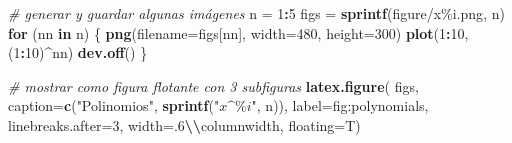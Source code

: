 \documentclass[a4paper,conference]{IEEEtran}
\newenvironment{Shaded}{\begin{snugshade}}{\end{snugshade}}
\newcommand{\AttributeTok}[1]{\textcolor[rgb]{0.13,0.29,0.53}{#1}}
\newcommand{\CommentTok}[1]{\textcolor[rgb]{0.56,0.35,0.01}{\textit{#1}}}
\newcommand{\ControlFlowTok}[1]{\textcolor[rgb]{0.13,0.29,0.53}{\textbf{#1}}}
\newcommand{\DecValTok}[1]{\textcolor[rgb]{0.00,0.00,0.81}{#1}}
\newcommand{\FunctionTok}[1]{\textcolor[rgb]{0.13,0.29,0.53}{\textbf{#1}}}
\newcommand{\NormalTok}[1]{#1}
\newcommand{\OtherTok}[1]{\textcolor[rgb]{0.56,0.35,0.01}{#1}}
\newcommand{\SpecialCharTok}[1]{\textcolor[rgb]{0.81,0.36,0.00}{\textbf{#1}}}
\newcommand{\StringTok}[1]{\textcolor[rgb]{0.31,0.60,0.02}{#1}}
\begin{document}
\begin{Shaded}
\begin{Highlighting}[]
\CommentTok{\# generar y guardar algunas imágenes}
\NormalTok{n }\OtherTok{=} \DecValTok{1}\SpecialCharTok{:}\DecValTok{5}
\NormalTok{figs }\OtherTok{=} \FunctionTok{sprintf}\NormalTok{(}\StringTok{\textquotesingle{}figure/x\%i.png\textquotesingle{}}\NormalTok{, n)}
\ControlFlowTok{for}\NormalTok{ (nn }\ControlFlowTok{in}\NormalTok{ n) \{}
  \FunctionTok{png}\NormalTok{(}\AttributeTok{filename=}\NormalTok{figs[nn], }\AttributeTok{width=}\DecValTok{480}\NormalTok{, }\AttributeTok{height=}\DecValTok{300}\NormalTok{)}
  \FunctionTok{plot}\NormalTok{(}\DecValTok{1}\SpecialCharTok{:}\DecValTok{10}\NormalTok{, (}\DecValTok{1}\SpecialCharTok{:}\DecValTok{10}\NormalTok{)}\SpecialCharTok{\^{}}\NormalTok{nn)}
  \FunctionTok{dev.off}\NormalTok{()}
\NormalTok{\}}

\CommentTok{\# mostrar como figura flotante con 3 subfiguras}
\FunctionTok{latex.figure}\NormalTok{(}
\NormalTok{  figs,}
  \AttributeTok{caption=}\FunctionTok{c}\NormalTok{(}\StringTok{"Polinomios"}\NormalTok{,}
            \FunctionTok{sprintf}\NormalTok{(}\StringTok{"$x\^{}\%i$"}\NormalTok{, n)),}
  \AttributeTok{label=}\StringTok{\textquotesingle{}fig:polynomials\textquotesingle{}}\NormalTok{,}
  \AttributeTok{linebreaks.after=}\DecValTok{3}\NormalTok{,}
  \AttributeTok{width=}\StringTok{\textquotesingle{}.6}\SpecialCharTok{\textbackslash{}\textbackslash{}}\StringTok{columnwidth\textquotesingle{}}\NormalTok{,}
  \AttributeTok{floating=}\NormalTok{T)}
\end{Highlighting}
\end{Shaded}
\end{document}
